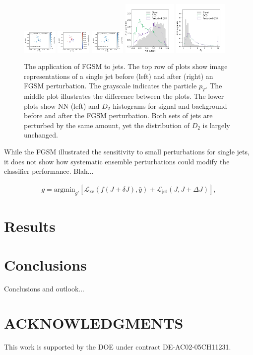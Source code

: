 \documentclass[reprint,nofootinbib,...]{revtex4-1}
\begin{document}
\begin{figure}[h!]
\centering
\includegraphics[width=0.15\textwidth]{figures/panel_1.pdf}
\includegraphics[width=0.15\textwidth]{figures/panel_3.pdf}
\includegraphics[width=0.15\textwidth]{figures/panel_2.pdf}
\includegraphics[width=0.23\textwidth]{figures/NN_FGSM.pdf}
\includegraphics[width=0.23\textwidth]{figures/D2_FGSM.pdf}
\caption{The application of FGSM to jets.  The top row of plots show image representations of a single jet before (left) and after (right) an FGSM perturbation.  The grayscale indicates the particle $p_T$.  The middle plot illustrates the difference between the plots.  The lower plots show NN (left) and $D_2$ histograms for signal and background before and after the FGSM perturbation.  Both sets of jets are perturbed by the same amount, yet the distribution of $D_2$ is largely unchanged. }
\label{fig:FGSM}
\end{figure}

While the FGSM illustrated the sensitivity to small perturbations for single jets, it does not show how systematic ensemble perturbations could modify the classifier performance.  Blah...

\begin{align}
\label{eq:global}
g=\text{argmin}_{g'}\left[\mathcal{L}_\text{xe}(f(J+\delta J),\bar{y})+\mathcal{L}_\text{jet}(J,J+\Delta J)\right],
\end{align}

\section{Results}

\section{Conclusions}
Conclusions and outlook...

\section*{ACKNOWLEDGMENTS}

This work is supported by the DOE under contract DE-AC02-05CH11231. 


\end{document}
